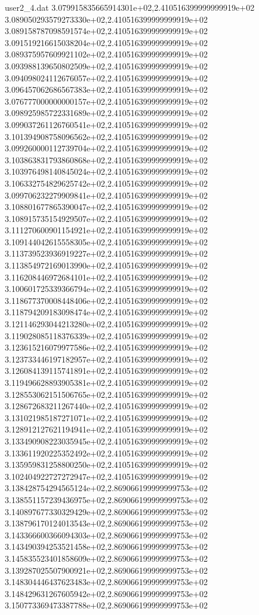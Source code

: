 \begin{filecontents}{user2_4.dat}
3.079915835665914301e+02,2.410516399999999919e+02
3.089050293579273330e+02,2.410516399999999919e+02
3.089158787098591574e+02,2.410516399999999919e+02
3.091519216615038204e+02,2.410516399999999919e+02
3.089375957609921102e+02,2.410516399999999919e+02
3.093988139650802509e+02,2.410516399999999919e+02
3.094098024112676057e+02,2.410516399999999919e+02
3.096457062686567383e+02,2.410516399999999919e+02
3.076777000000000157e+02,2.410516399999999919e+02
3.098925985722331689e+02,2.410516399999999919e+02
3.099037261126760541e+02,2.410516399999999919e+02
3.101394908758096562e+02,2.410516399999999919e+02
3.099260000112739704e+02,2.410516399999999919e+02
3.103863831793860868e+02,2.410516399999999919e+02
3.103976498140845024e+02,2.410516399999999919e+02
3.106332754829625742e+02,2.410516399999999919e+02
3.099706232279909841e+02,2.410516399999999919e+02
3.108801677865390047e+02,2.410516399999999919e+02
3.108915735154929507e+02,2.410516399999999919e+02
3.111270600901154921e+02,2.410516399999999919e+02
3.109144042615558305e+02,2.410516399999999919e+02
3.113739523936919227e+02,2.410516399999999919e+02
3.113854972169013990e+02,2.410516399999999919e+02
3.116208446972684101e+02,2.410516399999999919e+02
3.100601725339366794e+02,2.410516399999999919e+02
3.118677370008448406e+02,2.410516399999999919e+02
3.118794209183098474e+02,2.410516399999999919e+02
3.121146293044213280e+02,2.410516399999999919e+02
3.119028085118376339e+02,2.410516399999999919e+02
3.123615216079977586e+02,2.410516399999999919e+02
3.123733446197182957e+02,2.410516399999999919e+02
3.126084139115741891e+02,2.410516399999999919e+02
3.119496628893905381e+02,2.410516399999999919e+02
3.128553062151506765e+02,2.410516399999999919e+02
3.128672683211267440e+02,2.410516399999999919e+02
3.131021985187271071e+02,2.410516399999999919e+02
3.128912127621194941e+02,2.410516399999999919e+02
3.133490908223035945e+02,2.410516399999999919e+02
3.133611920225352492e+02,2.410516399999999919e+02
3.135959831258800250e+02,2.410516399999999919e+02
3.102404922727272947e+02,2.410516399999999919e+02
3.138428754294565124e+02,2.869066199999999753e+02
3.138551157239436975e+02,2.869066199999999753e+02
3.140897677330329429e+02,2.869066199999999753e+02
3.138796170124013543e+02,2.869066199999999753e+02
3.143366600366094303e+02,2.869066199999999753e+02
3.143490394253521458e+02,2.869066199999999753e+02
3.145835523401858609e+02,2.869066199999999753e+02
3.139287025507900921e+02,2.869066199999999753e+02
3.148304446437623483e+02,2.869066199999999753e+02
3.148429631267605942e+02,2.869066199999999753e+02
3.150773369473387788e+02,2.869066199999999753e+02

\end{filecontents}
